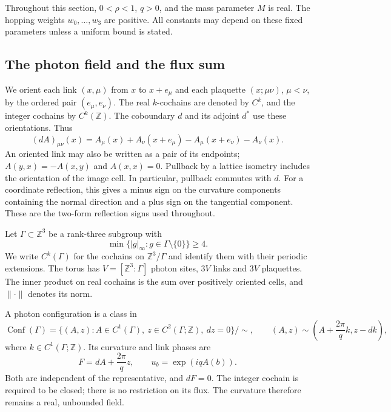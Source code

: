 \documentclass[11pt,letterpaper,reqno]{amsart}
\newcommand{\Z}{\mathbb Z}
\begin{document}
Throughout this section, $0<\rho<1$, $q>0$, and the mass parameter $M$
is real. The hopping weights $w_0,\ldots,w_3$ are positive. All constants may depend on these fixed parameters unless a uniform
bound is stated.

\subsection{The photon field and the flux sum}\label{subsec:reg-photon}

We orient each link $(x,\mu)$ from $x$ to $x+e_\mu$ and each plaquette
$(x;\mu\nu)$, $\mu<\nu$, by the ordered pair $(e_\mu,e_\nu)$.
The real $k$-cochains are denoted by $C^k$, and the integer cochains by
$C^k(\Z)$. The coboundary $d$ and its adjoint $d^*$ use these
orientations. Thus
\begin{equation}\label{eq:reg-coboundary}
 (dA)_{\mu\nu}(x)=A_\mu(x)+A_\nu(x+e_\mu)
                     -A_\mu(x+e_\nu)-A_\nu(x).
\end{equation}
An oriented link may also be written as a pair of its endpoints;
$A(y,x)=-A(x,y)$ and $A(x,x)=0$. Pullback by a lattice isometry includes
the orientation of the image cell. In particular, pullback commutes
with $d$. For a coordinate reflection, this gives a minus sign on
the curvature components containing the normal direction and a
plus sign on the tangential component. These are the two-form
reflection signs used throughout.

Let $\Gamma\subset\Z^3$ be a rank-three subgroup with
\[
 \min\{|g|_\infty:g\in\Gamma\setminus\{0\}\}\ge4.
\]
We write $C^k(\Gamma)$ for the cochains on $\Z^3/\Gamma$ and identify
them with their periodic extensions. The torus has
$V=[\Z^3:\Gamma]$ photon sites, $3V$ links and $3V$ plaquettes. The
inner product on real cochains is the sum over positively oriented
cells, and $\|\cdot\|$ denotes its norm.

A photon configuration is a class in
\begin{equation}\label{eq:reg-configuration}
 \operatorname{Conf}(\Gamma)
 =\{(A,z):A\in C^1(\Gamma),\ z\in C^2(\Gamma;\Z),\ dz=0\}/\!\sim,
 \qquad
 (A,z)\sim\left(A+\frac{2\pi}{q}k,z-dk\right),
\end{equation}
where $k\in C^1(\Gamma;\Z)$. Its curvature and link phases are
\begin{equation}\label{eq:reg-curvature}
 F=dA+\frac{2\pi}{q}z,
 \qquad u_b=\exp(iqA(b)).
\end{equation}
Both are independent of the representative, and $dF=0$. The integer
cochain is required to be closed; there is no restriction on its flux.
The curvature therefore remains a real, unbounded field.
\end{document}
